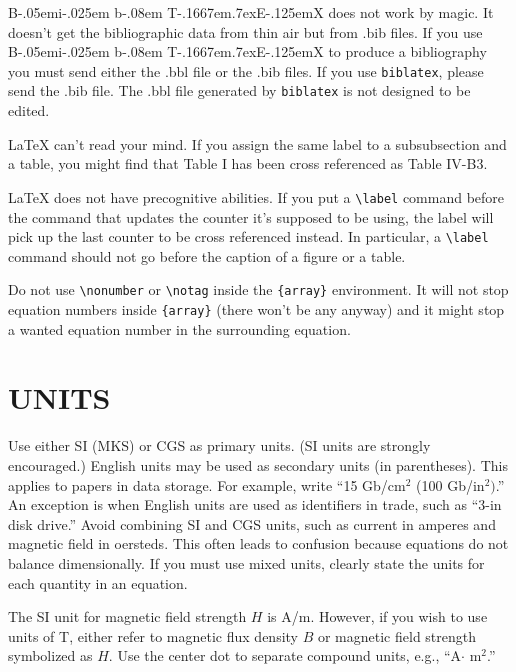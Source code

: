 \documentclass{IEEEoj-data}
\def\BibTeX{{\rm B\kern-.05em{\sc i\kern-.025em b}\kern-.08em
    T\kern-.1667em\lower.7ex\hbox{E}\kern-.125emX}}
\begin{document}
{{\BibTeX} does not work by magic. It doesn't get the bibliographic
data from thin air but from .bib files. If you use {\BibTeX} to produce a
bibliography you must send either the .bbl file or the .bib files.
If you use \texttt{biblatex}, please send the .bib file. The .bbl file
generated by \texttt{biblatex} is not designed to be edited.

{\LaTeX} can't read your mind. If you assign the same label to a
subsubsection and a table, you might find that Table I has been cross
referenced as Table IV-B3.

{\LaTeX} does not have precognitive abilities. If you put a
\verb|\label| command before the command that updates the counter it's
supposed to be using, the label will pick up the last counter to be
cross referenced instead. In particular, a \verb|\label| command
should not go before the caption of a figure or a table.

Do not use \verb|\nonumber| or \verb|\notag| inside the \verb|{array}| environment. It
will not stop equation numbers inside \verb|{array}| (there won't be
any anyway) and it might stop a wanted equation number in the
surrounding equation.

\section*{UNITS}
Use either SI (MKS) or CGS as primary units. (SI units are strongly 
encouraged.) English units may be used as secondary units (in parentheses). 
This applies to papers in data storage. For example, write ``15 Gb/cm$^{2}$ 
(100 Gb/in$^{2})$.'' An exception is when English units are used as 
identifiers in trade, such as ``3\textonehalf -in disk drive.'' Avoid 
combining SI and CGS units, such as current in amperes and magnetic field in 
oersteds. This often leads to confusion because equations do not balance 
dimensionally. If you must use mixed units, clearly state the units for each 
quantity in an equation.

The SI unit for magnetic field strength $H$ is A/m. However, if you wish to use 
units of T, either refer to magnetic flux density $B$ or magnetic field 
strength symbolized as \textmu $H$. Use the center dot to separate 
compound units, e.g., ``A$\cdot$ m$^{2}$.''

}
\end{document}

